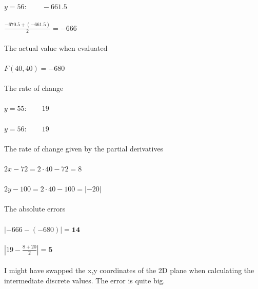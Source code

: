 \documentclass[]{article}
\begin{document}
$ y = 56 : \qquad -661.5$\\\\
$ \frac{-670.5 + (-661.5)} {2} = -666 $\\\\
The actual value when evaluated\\\\
$ F(40,40) = -680 $\\\\
The rate of change\\\\
$ y = 55 : \qquad 19$\\\\
$ y = 56 : \qquad 19$\\\\
The rate of change given by the partial derivatives\\\\
$2x - 72 = 2 \cdot 40 - 72  = 8 $\\\\
$2y - 100 = 2 \cdot 40 - 100  = |-20|$\\\\
The absolute errors\\\\
$ |-666 - (-680)| = \textbf{14} $\\\\
$ |19 - \frac{8 + 20}{2}| = \textbf{5} $\\\\
I might have swapped the x,y coordinates of the 2D plane when calculating the intermediate discrete values. The error is quite big.
\end{document}
